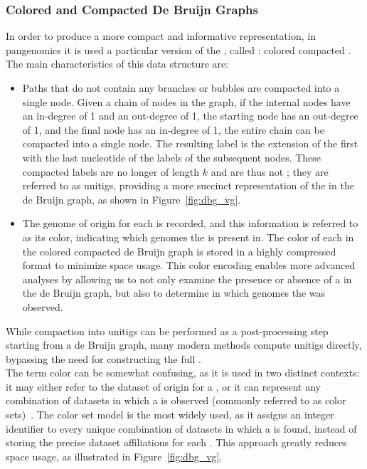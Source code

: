 \subsubsection{Colored and Compacted De Bruijn Graphs}
\label{sec:ccdbg}
In order to produce a more compact and informative representation, in pangenomics it is used a particular version of the \dbg, called \ccdbg: colored compacted \dbg. The main characteristics of this data structure are:
\begin{itemize}
	\item Paths that do not contain any branches or bubbles are compacted into a single node. Given a chain of nodes in the graph, if the internal nodes have an in-degree of 1 and an out-degree of 1, the starting node has an out-degree of 1, and the final node has an in-degree of 1, the entire chain can be compacted into a single node. The resulting label is the extension of the first \kmer with the last nucleotide of the labels of the subsequent nodes. These compacted labels are no longer of length $k$ and are thus not \kmers; they are referred to as unitigs, providing a more succinct representation of the \kmers in the de Bruijn graph, as shown in Figure~\ref{fig:dbg_vg}.
	\item The genome of origin for each \kmer is recorded, and this information is referred to as its color, indicating which genomes the \kmer is present in. The color of each \kmer in the colored compacted de Bruijn graph is stored in a highly compressed format to minimize space usage. This color encoding enables more advanced analyses by allowing us to not only examine the presence or absence of a \kmer in the de Bruijn graph, but also to determine in which genomes the \kmer was observed.
\end{itemize}
While \kmer compaction into unitigs can be performed as a post-processing step starting from a de Bruijn graph, many modern methods compute unitigs directly, bypassing the need for constructing the full \dbg.\\
The term color can be somewhat confusing, as it is used in two distinct contexts: it may either refer to the dataset of origin for a \kmer, or it can represent any combination of datasets in which a \kmer is observed (commonly referred to as color sets)~\cite{marchet_kmersets}. The color set model is the most widely used, as it assigns an integer identifier to every unique combination of datasets in which a \kmer is found, instead of storing the precise dataset affiliations for each \kmer. This approach greatly reduces space usage, as illustrated in Figure~\ref{fig:dbg_vg}. 
